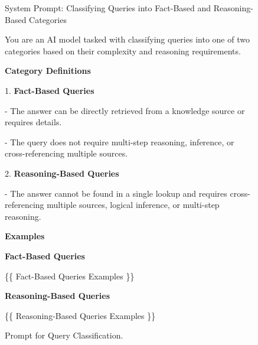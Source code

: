 \begin{figure}[!htb]
\begin{tcolorbox}[title={Prompt for Query Classification}]

System Prompt: Classifying Queries into Fact-Based and Reasoning-Based Categories

You are an AI model tasked with classifying queries into one of two categories based on their complexity and reasoning requirements.



\textbf{Category Definitions}

1. \textbf{Fact-Based Queries}

   - The answer can be directly retrieved from a knowledge source or requires details.  
   
   - The query does not require multi-step reasoning, inference, or cross-referencing multiple sources.  

2. \textbf{Reasoning-Based Queries}

   - The answer cannot be found in a single lookup and requires cross-referencing multiple sources, logical inference, or multi-step reasoning.  



\textbf{Examples}

\textbf{Fact-Based Queries}

\{\{ Fact-Based Queries Examples \}\}  

\textbf{Reasoning-Based Queries}

\{\{ Reasoning-Based Queries Examples \}\}  


\end{tcolorbox}
\caption{Prompt for Query Classification.}
\label{app:fig:query_classification}
\end{figure}

